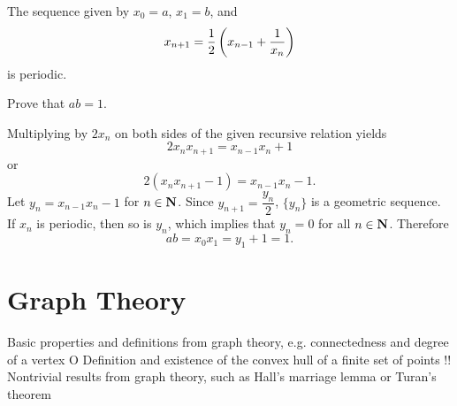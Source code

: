 \begin{solution}
\end{solution}
\pagebreak

\begin{prbm}
The sequence given by $x_0=a$, $x_1=b$, and
\[ x_{n+1}=\frac{1}{2}\left(x_{n-1}+\frac{1}{x_n}\right) \]
is periodic.

Prove that $ab=1$.
\end{prbm}

\begin{solution}
Multiplying by $2x_n$ on both sides of the given recursive relation yields
\[ 2x_nx_{n+1}=x_{n-1}x_n+1 \]
or
\[ 2(x_nx_{n+1}-1)=x_{n-1}x_n-1. \]
Let $y_n=x_{n-1}x_n-1$ for $n\in\mathbf N$. Since $y_{n+1}=\dfrac{y_n}{2}$, $\{y_n\}$ is a geometric sequence. If $x_n$ is periodic, then so is $y_n$, which implies that $y_n=0$ for all $n\in\mathbf N$. Therefore
\[ ab=x_0x_1=y_1+1=1. \]
\end{solution}

\chapter{Graph Theory}
Basic properties and definitions from graph theory, e.g. connectedness and degree of a vertex
O Definition and existence of the convex hull of a finite set of points %
!! Nontrivial results from graph theory, such as Hall's marriage lemma or Turan's theorem
